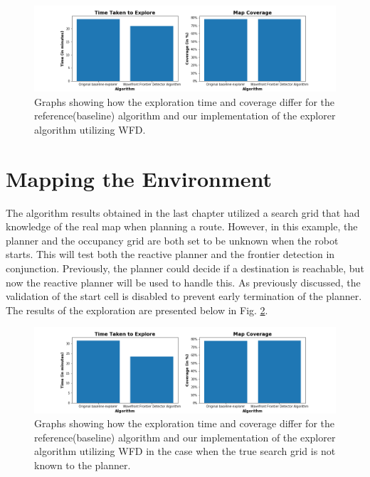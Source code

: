 \documentclass[a4paper,12pt]{article}
\begin{document}
				\begin{figure}[H]
					\centering
					\includegraphics[scale=0.5]{images/Part2.png}
					\caption{Graphs showing how the exploration time and coverage differ for the reference(baseline) algorithm and our implementation of the explorer algorithm utilizing WFD.}
					\label{Part2}
				\end{figure}

	
	
	\section{Mapping the Environment}
		The algorithm results obtained in the last chapter utilized a search grid that had knowledge of the real map when planning a route. However, in this example, the planner and the occupancy grid are both set to be unknown when the robot starts. This will test both the reactive planner and the frontier detection in conjunction. Previously, the planner could decide if a destination is reachable, but now the reactive planner will be used to handle this. As previously discussed, the validation of the start cell is disabled to prevent early termination of the planner. The results of the exploration are presented below in Fig. \ref{Part3}. 

		\begin{figure}[H]
			\centering
			\includegraphics[scale=0.5]{images/Part3.png}
			\caption{Graphs showing how the exploration time and coverage differ for the reference(baseline) algorithm and our implementation of the explorer algorithm utilizing WFD in the case when the true search grid is not known to the planner.}
			\label{Part3}
		\end{figure}
\end{document}
